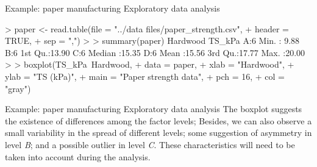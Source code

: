 \documentclass[t]{beamer}
\begin{document}

\begin{ftstf}
{Example: paper manufacturing}
{Exploratory data analysis}
\begin{rcode}
> paper   <- read.table(file = "../data files/paper_strength.csv", 
+                       header = TRUE, 
+                       sep = ",")
>
> summary(paper)
 Hardwood     TS_kPa     
 A:6      Min.   : 9.88  
 B:6      1st Qu.:13.90  
 C:6      Median :15.35  
 D:6      Mean   :15.56  
          3rd Qu.:17.77  
          Max.   :20.00  
> 
> boxplot(TS_kPa~Hardwood, 
+         data = paper, 
+         xlab = "Hardwood",
+         ylab = "TS (kPa)", 
+         main = "Paper strength data",
+         pch  = 16,
+         col  = "gray")
\end{rcode}
\end{ftstf}


\begin{ftst}
{Example: paper manufacturing}
{Exploratory data analysis}
The boxplot suggests the existence of differences among the factor levels;
\vone
Besides, we can also observe a small variability in the spread of different levels; some suggestion of asymmetry in level \textit{B}; and a possible outlier in level \textit{C}.
\vone
These characteristics will need to be\\
taken into account during the analysis.
\end{ftst}

\end{document}
